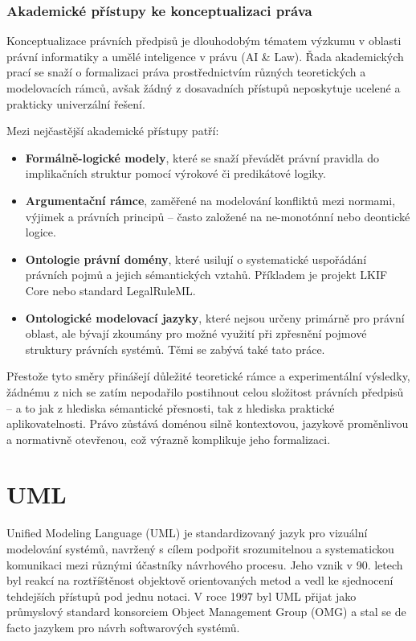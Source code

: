 
\subsubsection{Akademické přístupy ke konceptualizaci práva}
\label{akademicka_konceptualizace}

Konceptualizace právních předpisů je dlouhodobým tématem výzkumu v oblasti právní informatiky a umělé inteligence v právu (AI \& Law). Řada akademických prací se snaží o formalizaci práva prostřednictvím různých teoretických a modelovacích rámců, avšak žádný z dosavadních přístupů neposkytuje ucelené a prakticky univerzální řešení. \cite{Prakken2005}

Mezi nejčastější akademické přístupy patří:

\begin{itemize}
\item \textbf{Formálně-logické modely}, které se snaží převádět právní pravidla do implikačních struktur pomocí výrokové či predikátové logiky.
\item \textbf{Argumentační rámce}, zaměřené na modelování konfliktů mezi normami, výjimek a právních principů – často založené na ne-monotónní nebo deontické logice.
\item \textbf{Ontologie právní domény}, které usilují o systematické uspořádání právních pojmů a jejich sémantických vztahů. Příkladem je projekt LKIF Core nebo standard LegalRuleML.
\item \textbf{Ontologické modelovací jazyky}, které nejsou určeny primárně pro právní oblast, ale bývají zkoumány pro možné využití při zpřesnění pojmové struktury právních systémů. Těmi se zabývá také tato práce. \cite{McCarty1976,Rissland1987,Prakken2005,Athan2015,Boer2007}
\end{itemize}

Přestože tyto směry přinášejí důležité teoretické rámce a experimentální výsledky, žádnému z nich se zatím nepodařilo postihnout celou složitost právních předpisů – a to jak z hlediska sémantické přesnosti, tak z hlediska praktické aplikovatelnosti. Právo zůstává doménou silně kontextovou, jazykově proměnlivou a normativně otevřenou, což výrazně komplikuje jeho formalizaci. \cite{BenchCapon2012}


\section{UML}
\label{sec:uml}
Unified Modeling Language (UML) je standardizovaný jazyk pro vizuální modelování systémů, navržený s cílem podpořit srozumitelnou a systematickou komunikaci mezi různými účastníky návrhového procesu. Jeho vznik v 90. letech byl reakcí na roztříštěnost objektově orientovaných metod a vedl ke sjednocení tehdejších přístupů pod jednu notaci. V roce 1997 byl UML přijat jako průmyslový standard konsorciem Object Management Group (OMG) a stal se de facto jazykem pro návrh softwarových systémů. \cite{Pergl2018, Engels2000}

